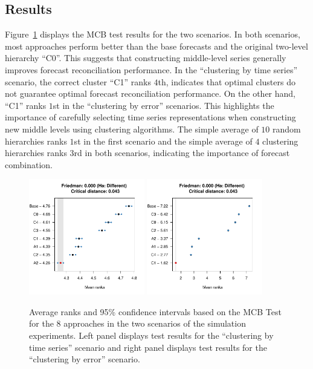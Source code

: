 \documentclass[a4paper,review,12pt,authoryear]{elsarticle}
\begin{document}
\subsection{Results}
\label{sec:simu_res}

Figure~\ref{fig:simu_mcb} displays the MCB test results for the two scenarios. 
In both scenarios, most approaches perform better than the base forecasts and the original two-level hierarchy ``C0''. This suggests that constructing middle-level series generally improves forecast reconciliation performance.
In the ``clustering by time series'' scenario, the correct cluster ``C1'' ranks $4$th, indicates that optimal clusters do not guarantee optimal forecast reconciliation performance. 
On the other hand, ``C1'' ranks $1$st in the ``clustering by error'' scenarios. This highlights the importance of carefully selecting time series representations when constructing new middle levels using clustering algorithms.
The simple average of $10$ random hierarchies ranks $1$st in the first scenario and the simple average of $4$ clustering hierarchies ranks $3$rd in both scenarios, indicating the importance of forecast combination.


\begin{figure}
    \centering
    \includegraphics[width=0.45\textwidth]{figures/simu_mcb1.pdf}
    \includegraphics[width=0.45\textwidth]{figures/simu_mcb2.pdf}
    \caption{\label{fig:simu_mcb}Average ranks and 95\% confidence intervals based on the MCB Test for the $8$ approaches in the two scenarios of the simulation experiments. Left panel displays test results for the ``clustering by time series'' scenario and right panel displays test results for the ``clustering by error'' scenario.}
\end{figure}
\end{document}
